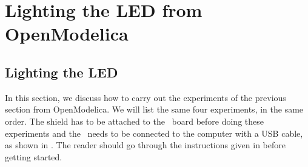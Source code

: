 \section{Lighting the LED from OpenModelica}
\subsection{Lighting the LED}
\label{sec:light-OpenModelica}
In this section, we discuss how to carry out the experiments of the
previous section from OpenModelica.  We will list the same four experiments,
in the same order.  The shield has to be attached to the \arduino\ board
before doing these experiments and the \arduino\ needs to be connected to the computer 
with a USB cable, as shown in .
The reader should go through the instructions given in
 before getting started.

